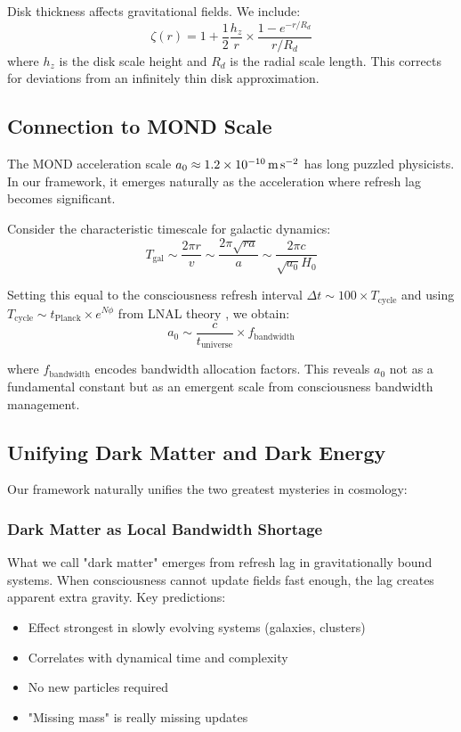 \documentclass[twocolumn,prd,amsmath,amssymb,aps,superscriptaddress,nofootinbib]{revtex4-2}
\newcommand{\azero}{a_0}
\begin{document}
Disk thickness affects gravitational fields. We include:
\begin{equation}
\zeta(r) = 1 + \frac{1}{2}\frac{h_z}{r} \times \frac{1 - e^{-r/R_d}}{r/R_d}
\label{eq:geometric}
\end{equation}
where $h_z$ is the disk scale height and $R_d$ is the radial scale length. This corrects for deviations from an infinitely thin disk approximation.

\subsection{Connection to MOND Scale}

The MOND acceleration scale $\azero \approx 1.2 \times 10^{-10}\,\text{m\,s}^{-2}$ has long puzzled physicists. In our framework, it emerges naturally as the acceleration where refresh lag becomes significant.

Consider the characteristic timescale for galactic dynamics:
\begin{equation}
T_{\text{gal}} \sim \frac{2\pi r}{v} \sim \frac{2\pi \sqrt{r a}}{a} \sim \frac{2\pi c}{\sqrt{\azero} H_0}
\end{equation}

Setting this equal to the consciousness refresh interval $\Delta t \sim 100 \times T_{\text{cycle}}$ and using $T_{\text{cycle}} \sim t_{\text{Planck}} \times e^{N\phi}$ from LNAL theory \cite{Washburn2024}, we obtain:
\begin{equation}
\azero \sim \frac{c}{t_{\text{universe}}} \times f_{\text{bandwidth}}
\label{eq:a0_derivation}
\end{equation}

where $f_{\text{bandwidth}}$ encodes bandwidth allocation factors. This reveals $\azero$ not as a fundamental constant but as an emergent scale from consciousness bandwidth management.

\subsection{Unifying Dark Matter and Dark Energy}

Our framework naturally unifies the two greatest mysteries in cosmology:

\subsubsection{Dark Matter as Local Bandwidth Shortage}

What we call "dark matter" emerges from refresh lag in gravitationally bound systems. When consciousness cannot update fields fast enough, the lag creates apparent extra gravity. Key predictions:
\begin{itemize}
\item Effect strongest in slowly evolving systems (galaxies, clusters)
\item Correlates with dynamical time and complexity
\item No new particles required
\item "Missing mass" is really missing updates
\end{itemize}
\end{document}
